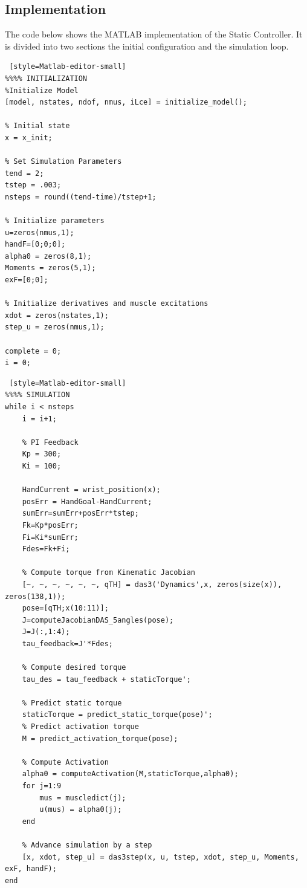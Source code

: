 \subsection{Implementation}

The code below shows the MATLAB implementation of the Static Controller. It is divided into two sections the initial configuration and the simulation loop.

\begin{lstlisting} [style=Matlab-editor-small]
%%%% INITIALIZATION
%Initialize Model
[model, nstates, ndof, nmus, iLce] = initialize_model();

% Initial state
x = x_init; 

% Set Simulation Parameters
tend = 2;
tstep = .003;
nsteps = round((tend-time)/tstep+1;

% Initialize parameters
u=zeros(nmus,1);
handF=[0;0;0];
alpha0 = zeros(8,1);
Moments = zeros(5,1);
exF=[0;0];

% Initialize derivatives and muscle excitations
xdot = zeros(nstates,1);
step_u = zeros(nmus,1);
        
complete = 0;
i = 0;
\end{lstlisting}
\newpage
\begin{lstlisting} [style=Matlab-editor-small]
%%%% SIMULATION
while i < nsteps
    i = i+1;
    
    % PI Feedback
    Kp = 300;
    Ki = 100;
    
    HandCurrent = wrist_position(x);
    posErr = HandGoal-HandCurrent;
    sumErr=sumErr+posErr*tstep;
    Fk=Kp*posErr;
    Fi=Ki*sumErr;
    Fdes=Fk+Fi;
    
    % Compute torque from Kinematic Jacobian
    [~, ~, ~, ~, ~, ~, qTH] = das3('Dynamics',x, zeros(size(x)), zeros(138,1));
    pose=[qTH;x(10:11)];
    J=computeJacobianDAS_5angles(pose);
    J=J(:,1:4);
    tau_feedback=J'*Fdes;
    
    % Compute desired torque
    tau_des = tau_feedback + staticTorque';

    % Predict static torque
    staticTorque = predict_static_torque(pose)';
    % Predict activation torque
    M = predict_activation_torque(pose);
    
    % Compute Activation
    alpha0 = computeActivation(M,staticTorque,alpha0);
    for j=1:9
        mus = muscledict(j);
        u(mus) = alpha0(j);
    end
    
    % Advance simulation by a step
    [x, xdot, step_u] = das3step(x, u, tstep, xdot, step_u, Moments, exF, handF);
end                
\end{lstlisting}

